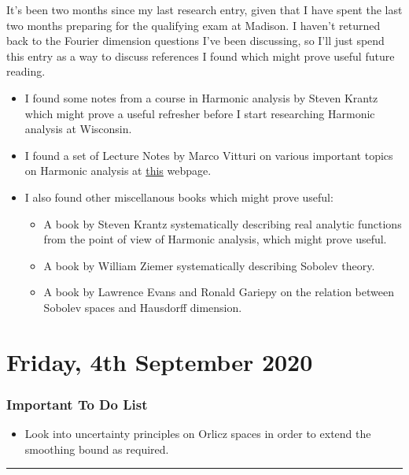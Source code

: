 \documentclass[openany,nobib,nols,a4paper,twoside,symmetric,justified,notoc]{tufte-book}
\theoremstyle{plain}
\theoremstyle{remark}
\theoremstyle{definition}
\newenvironment{importanttodo}%
    {\subsection{Important To Do List}}%
    {\vspace{2mm}\hrule\hspace{\stretch{1}}\\}
\begin{document}
It's been two months since my last research entry, given that I have spent the last two months preparing for the qualifying exam at Madison. I haven't returned back to the Fourier dimension questions I've been discussing, so I'll just spend this entry as a way to discuss references I found which might prove useful future reading.
%
\begin{itemize}
    \item I found some notes \cite{Krantz2007} from a course in Harmonic analysis by Steven Krantz which might prove a useful refresher before I start researching Harmonic analysis at Wisconsin.

    \item I found a set of Lecture Notes by Marco Vitturi on various important topics on Harmonic analysis at \href{https://www.math.sciences.univ-nantes.fr/~vitturi/lecture_notes/lecture_notes.html}{this} webpage.

    \item I also found other miscellanous books which might prove useful:
    \begin{itemize}
        \item A book by Steven Krantz \cite{Krantz2002} systematically describing real analytic functions from the point of view of Harmonic analysis, which might prove useful.

        \item A book \cite{Ziemer1989} by William Ziemer systematically describing Sobolev theory.

        \item A book \cite{Evans1992} by Lawrence Evans and Ronald Gariepy on the relation between Sobolev spaces and Hausdorff dimension.
    \end{itemize}
\end{itemize}






\chapter{Friday, 4th September 2020} \label{04092020}

\begin{importanttodo}
\begin{itemize}
    \item Look into uncertainty principles on Orlicz spaces in order to extend the smoothing bound as required.
\end{itemize}
\end{importanttodo}
\end{document}
